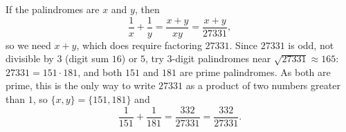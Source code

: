 If the palindromes are $x$ and $y$, then
\[\dfrac{1}{x}+\dfrac{1}{y}=\dfrac{x+y}{xy}=\dfrac{x+y}{27331},\]
so we need $x+y$, which does require factoring $27331$. Since $27331$ is odd, not divisible by $3$ (digit sum $16$) or $5$, try $3$-digit palindromes near $\sqrt{27331}\approx165$: $27331=151\cdot181$, and both $151$ and $181$ are prime palindromes. As both are prime, this is the only way to write $27331$ as a product of two numbers greater than $1$, so $\{x,y\}=\{151,181\}$ and
\[\dfrac{1}{151}+\dfrac{1}{181}=\dfrac{332}{27331}=\boxed{\dfrac{332}{27331}}.\]
